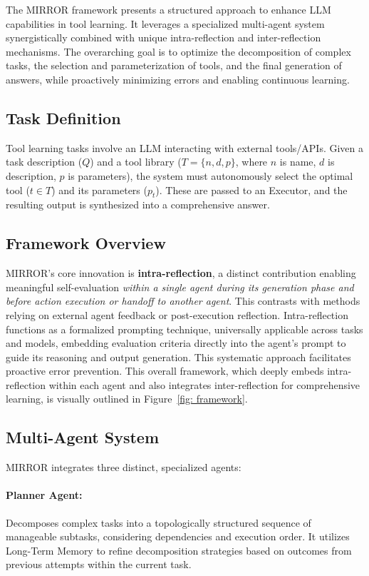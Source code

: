 \documentclass{article}
\begin{document}
The MIRROR framework presents a structured approach to enhance LLM capabilities in tool learning. It leverages a specialized multi-agent system synergistically combined with unique intra-reflection and inter-reflection mechanisms. The overarching goal is to optimize the decomposition of complex tasks, the selection and parameterization of tools, and the final generation of answers, while proactively minimizing errors and enabling continuous learning.


\subsection{Task Definition}
Tool learning tasks involve an LLM interacting with external tools/APIs. Given a task description ($Q$) and a tool library ($T = \{n, d, p\}$, where $n$ is name, $d$ is description, $p$ is parameters), the system must autonomously select the optimal tool ($t \in T$) and its parameters ($p_t$). These are passed to an Executor, and the resulting output is synthesized into a comprehensive answer.


\subsection{Framework Overview}
MIRROR's core innovation is \textbf{intra-reflection}, a distinct contribution enabling meaningful self-evaluation \textit{within a single agent during its generation phase and before action execution or handoff to another agent}. This contrasts with methods relying on external agent feedback or post-execution reflection. Intra-reflection functions as a formalized prompting technique, universally applicable across tasks and models, embedding evaluation criteria directly into the agent's prompt to guide its reasoning and output generation. This systematic approach facilitates proactive error prevention. This overall framework, which deeply embeds intra-reflection within each agent and also integrates inter-reflection for comprehensive learning, is visually outlined in Figure~\ref{fig: framework}.


\subsection{Multi-Agent System}
MIRROR integrates three distinct, specialized agents:

\paragraph{Planner Agent:} Decomposes complex tasks into a topologically structured sequence of manageable subtasks, considering dependencies and execution order. It utilizes Long-Term Memory to refine decomposition strategies based on outcomes from previous attempts within the current task.
\end{document}
